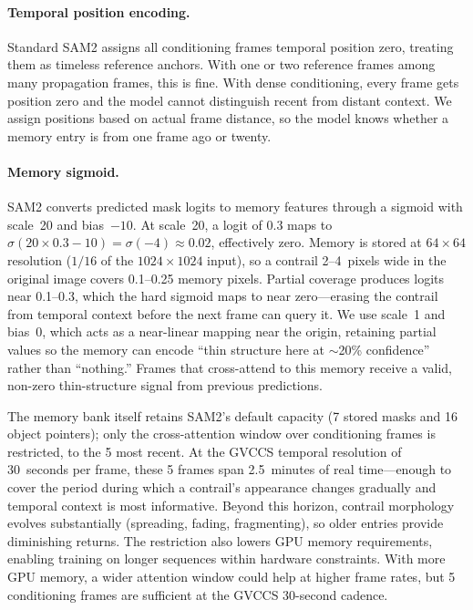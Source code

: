 \documentclass[review]{elsarticle}
\begin{document}
\paragraph{Temporal position encoding.} Standard SAM2 assigns all conditioning frames temporal position zero, treating them as timeless reference anchors. With one or two reference frames among many propagation frames, this is fine. With dense conditioning, every frame gets position zero and the model cannot distinguish recent from distant context. We assign positions based on actual frame distance, so the model knows whether a memory entry is from one frame ago or twenty.

\paragraph{Memory sigmoid.} SAM2 converts predicted mask logits to memory features through a sigmoid with scale~20 and bias~$-10$. At scale~20, a logit of $0.3$ maps to $\sigma(20 \times 0.3 - 10) = \sigma(-4) \approx 0.02$, effectively zero. Memory is stored at $64 \times 64$ resolution ($1/16$ of the $1024 \times 1024$ input), so a contrail 2--4~pixels wide in the original image covers 0.1--0.25 memory pixels. Partial coverage produces logits near 0.1--0.3, which the hard sigmoid maps to near zero---erasing the contrail from temporal context before the next frame can query it. We use scale~1 and bias~0, which acts as a near-linear mapping near the origin, retaining partial values so the memory can encode ``thin structure here at $\sim$20\% confidence'' rather than ``nothing.'' Frames that cross-attend to this memory receive a valid, non-zero thin-structure signal from previous predictions.

The memory bank itself retains SAM2's default capacity (7 stored masks and 16 object pointers); only the cross-attention window over conditioning frames is restricted, to the 5 most recent. At the GVCCS temporal resolution of 30~seconds per frame, these 5 frames span 2.5~minutes of real time---enough to cover the period during which a contrail's appearance changes gradually and temporal context is most informative. Beyond this horizon, contrail morphology evolves substantially (spreading, fading, fragmenting), so older entries provide diminishing returns. The restriction also lowers GPU memory requirements, enabling training on longer sequences within hardware constraints. With more GPU memory, a wider attention window could help at higher frame rates, but 5 conditioning frames are sufficient at the GVCCS 30-second cadence.
\end{document}
